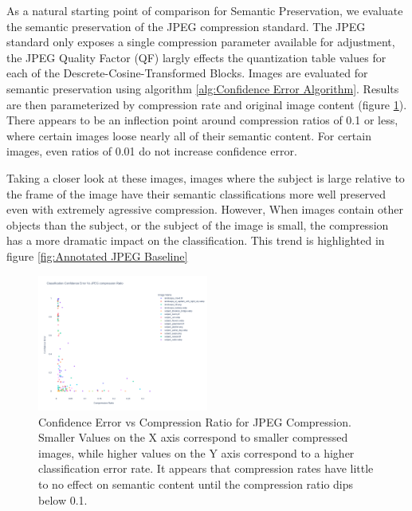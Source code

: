 As a natural starting point of comparison for Semantic Preservation, we evaluate the semantic preservation of the JPEG compression standard.
The JPEG standard only exposes a single compression parameter available for adjustment, the JPEG Quality Factor (QF) largly effects the quantization table values for each of the Descrete-Cosine-Transformed Blocks.
Images are evaluated for semantic preservation using algorithm \ref{alg:Confidence Error Algorithm}.
Results are then parameterized by compression rate and original image content (figure \ref{fig:Comp vs Ratio JPEG Baseline}). There appears to be an inflection point around compression ratios of 0.1 or less, where certain images loose nearly all of their semantic content. For certain images, even ratios of 0.01 do not increase confidence error.

Taking a closer look at these images, images where the subject is large relative to the frame of the image have their semantic classifications more well preserved even with extremely agressive compression. However, When images contain other objects than the subject, or the subject of the image is small, the compression has a more dramatic impact on the classification. This trend is highlighted in figure \ref{fig:Annotated JPEG Baseline}

\begin{figure}
    \includegraphics[width=0.5\textwidth]{assets/Baseline JPEG Confidence vs Comp Ratio.png}
    \caption{Confidence Error vs Compression Ratio for JPEG Compression. Smaller Values on the X axis correspond to smaller compressed images, while higher values on the Y axis correspond to a higher classification error rate. It appears that compression rates have little to no effect on semantic content until the compression ratio dips below 0.1.}
    \label{fig:Comp vs Ratio JPEG Baseline}
\end{figure}


